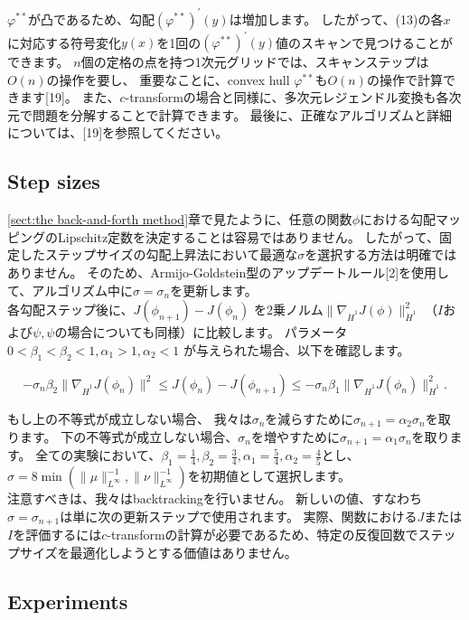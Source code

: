 \documentclass{jsarticle}
\theoremstyle{definition}
\begin{document}
$\varphi^{**}$が凸であるため、勾配$(\varphi^{**})^\prime(y)$は増加します。
したがって、(13)の各$x$に対応する符号変化$y(x)$を1回の$(\varphi^{**})^\prime(y)$値のスキャンで見つけることができます。
$n$個の定格の点を持つ1次元グリッドでは、スキャンステップは$O(n)$の操作を要し、
重要なことに、convex hull $\varphi^{**}$も$O(n)$の操作で計算できます[19]。
また、$c$-transformの場合と同様に、多次元レジェンドル変換も各次元で問題を分解することで計算できます。
最後に、正確なアルゴリズムと詳細については、[19]を参照してください。

\subsection{Step sizes}

\ref{sect:the back-and-forth method}章で見たように、任意の関数$\phi$における勾配マッピングのLipschitz定数を決定することは容易ではありません。
したがって、固定したステップサイズの勾配上昇法において最適な$\sigma$を選択する方法は明確ではありません。
そのため、Armijo-Goldstein型のアップデートルール[2]を使用して、アルゴリズム中に$\sigma = \sigma_n$を更新します。\\

各勾配ステップ後に、$J(\phi_{n+1})-J(\phi_n)$ を2乗ノルム$\| \nabla_{\dot{H}^1} J(\phi) \|_{\dot{H}^1}^2$ （$I$および$\psi, \psi$の場合についても同様）に比較します。
パラメータ$0<\beta_1<\beta_2<1, \alpha_1>1, \alpha_2<1$ が与えられた場合、以下を確認します。

$$
- \sigma_n \beta_2 \|\nabla_{\dot{H}^1} J(\phi_n)\|^2 \leq J(\phi_n)-J(\phi_{n+1}) \leq - \sigma_n \beta_1 \|\nabla_{\dot{H}^1} J(\phi_n)\|_{\dot{H}^1}^2.
$$

もし上の不等式が成立しない場合、
我々は$\sigma_n$を減らすために$\sigma_{n+1}=\alpha_2\sigma_n$を取ります。
下の不等式が成立しない場合、$\sigma_n$を増やすために$\sigma_{n+1}=\alpha_1\sigma_n$を取ります。
全ての実験において、$\beta_1 = \frac{1}{4},\beta_2 = \frac{3}{4}, \alpha_1 = \frac{5}{4}, \alpha_2 = \frac{4}{5}$とし、$\sigma = 8 \min(\|\mu\|_{L^\infty}^{-1}, \|\nu\|_{L^\infty}^{-1})$を初期値として選択します。\\

注意すべきは、我々はbacktrackingを行いません。
新しいの値、すなわち$\sigma = \sigma_{n+1}$は単に次の更新ステップで使用されます。
実際、関数における$J$または$I$を評価するには$c$-transformの計算が必要であるため、特定の反復回数でステップサイズを最適化しようとする価値はありません。


\subsection{Experiments}
\end{document}
